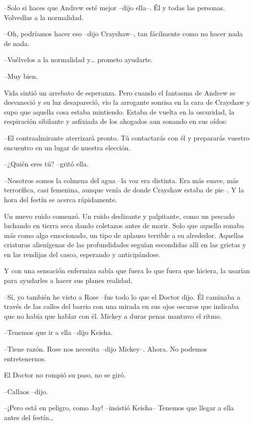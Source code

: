 {--Solo si haces que Andrew esté mejor --dijo ella--. Él y todas las
personas. Volvedlas a la normalidad.}

{--Oh, podríamos hacer eso --dijo Crayshaw--, tan fácilmente como no
hacer nada de nada.}

{--Vuélvelos a la normalidad y\ldots{} prometo ayudarte.}

{--Muy bien.}

{Vida sintió un arrebato de esperanza. Pero cuando el fantasma de Andrew
 se desvaneció y su luz desapareció, vio la arrogante sonrisa en la cara
 de Crayshaw y supo que aquella cosa estaba mintiendo. Estaba de vuelta
 en la oscuridad, la respiración sibilante y asfixiada de los ahogados
aun sonando en sus oídos:}

{--El contraalmirante aterrizará pronto. Tú contactarás con él y
prepararás vuestro encuentro en un lugar de nuestra elección.}

{--¿Quién eres tú? --gritó ella.}

{--Nosotros somos la colmena del agua --la voz era distinta. Era más
 suave, más terrorífica, casi femenina, aunque venía de donde Crayshaw
estaba de pie--. Y la hora del festín se acerca rápidamente.}

{Un nuevo ruido comenzó. Un ruido deslizante y palpitante, como un
 pescado luchando en tierra seca dando coletazos antes de morir. Solo que
 aquello sonaba más como algo emocionado, un tipo de aplauso terrible a
 su alrededor. Aquellas criaturas alienígenas de las profundidades
 seguían escondidas allí en las grietas y en las rendijas del casco,
esperando y anticipándose.}

{Y con una sensación enfermiza sabía que fuera lo que fuera que hiciera,
la usarían para ayudarles a hacer sus planes realidad.}

\mbox{}

{--Sí, yo también he visto a Rose --fue todo lo que el Doctor dijo. Él
 caminaba a través de las calles del barrio con una mirada en sus ojos
 oscuros que indicaba que no había que hablar con él. Mickey a duras
penas mantuvo el ritmo.}

{--Tenemos que ir a ella --dijo Keisha.}

{--Tiene razón. Rose nos necesita --dijo Mickey--. Ahora. No podemos
entretenernos.}

{El Doctor no rompió su paso, no se giró.}

{--Callaos --dijo.}

{--¡Pero está en peligro, como Jay! --insistió Keisha-- Tenemos que
 llegar a ella antes del festín\ldots{}}

